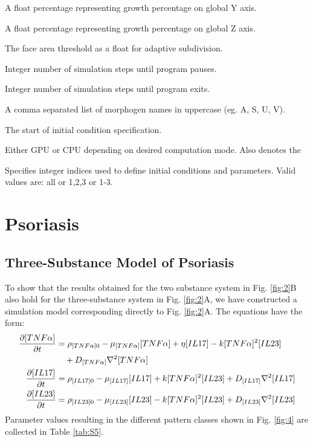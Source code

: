 \begin{description}[itemsep=0cm]
    \item[growthY:] A float percentage representing growth percentage on global Y axis.
    \item[growthZ:] A float percentage representing growth percentage on global Z axis.
    \item[maxFaceArea:] The face area threshold as a float for adaptive subdivision.
    \item[pauseAt:] Integer number of simulation steps until program pauses.
    \item[exitAt:] Integer number of simulation steps until program exits.
    \item[morphogens:] A comma separated list of morphogen names in uppercase (eg. A, S, U, V).
    \item[initialConditions:] The start of initial condition specification.
    \item[rdModel:] Either GPU or CPU depending on desired computation mode. Also denotes the
    \item[indices:] Specifies integer indices used to define initial conditions and parameters. Valid values are: all or 1,2,3 or 1-3.
\end{description}

\chapter{Psoriasis}
\section{Three-Substance Model of Psoriasis}
To show that the results obtained for the two substance system in Fig. \ref{fig:2}B also hold for the three-substance system in Fig. \ref{fig:2}A, we have constructed a simulation model corresponding directly to Fig. \ref{fig:2}A. The equations have the form: 
\begin{equation}
	\begin{aligned}
		\frac{\partial[TNF\alpha]}{\partial t}&=\rho_{[TNF\alpha]0}-\mu_{[TNF\alpha]}[TNF\alpha]+\eta[IL17]-k[TNF\alpha]^2[IL23] \\ & \quad{} + D_{[TNF\alpha]}\nabla^2[TNF\alpha]\\
		\frac{\partial[IL17]}{\partial t}     &=\rho_{[IL17]0}     -\mu_{[IL17]}[IL17]                     +k[TNF\alpha]^2[IL23]+D_{[IL17]}\nabla^2[IL17]\\
		\frac{\partial[IL23]}{\partial t}     &=\rho_{[IL23]0}     -\mu_{[IL23]}[IL23]                     -k[TNF\alpha]^2[IL23]+D_{[IL23]}\nabla^2[IL23]
	\end{aligned}
\end{equation}
Parameter values resulting in the different pattern classes shown in Fig. \ref{fig:4} are collected in Table \ref{tab:S5}.


